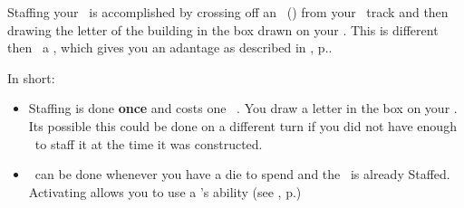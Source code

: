 Staffing your \armament\ is accomplished by crossing off an \astronaut\ (\useastronautsymbol) from your \population\ track and then drawing the letter of the building in the box drawn on your \planetsheet.
\newline\newline
This is different then \activating\ a \armament, which gives you an adantage as described in , p.\pageref{sec:armaments}.

In short:
\begin{itemize}
  \item Staffing is done \textbf{once} and costs one \astronaut\ \useastronautsymbol.  You draw a letter in the box on your \planetsheet.  Its possible this could be done on a different turn if you did not have enough \astronauts\ to staff it at the time it was constructed.
  \item \activating\ can be done whenever you have a die to spend and the \armament\ is already Staffed.  Activating allows you to use a \armament's ability (see , p.\pageref{sec:armaments})
\end{itemize}
